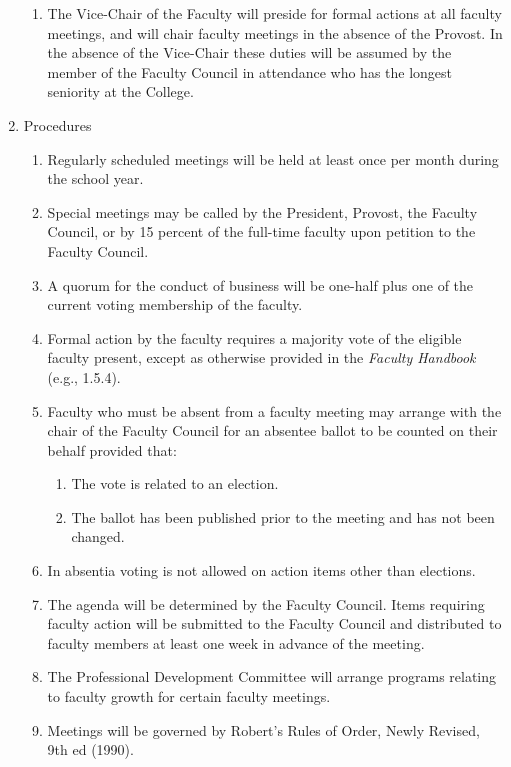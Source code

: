 \documentclass[letterpaper, 11pt]{article}
\begin{document}
\begin{enumerate}[label=\alph*)]
{\begin{enumerate}[label=\arabic*)]
							\item{The Vice-Chair of the Faculty will preside for formal actions at all faculty meetings, and will chair faculty meetings in the absence of the Provost.  In the absence of the Vice-Chair these duties will be assumed by the member of the Faculty Council in attendance who has the longest seniority at the College.}
						\end{enumerate}
					}
					\item{Procedures
						\begin{enumerate}[label=\arabic*)]
							\item{Regularly scheduled meetings will be held at least once per month during the school year.}
							\item{Special meetings may be called by the President, Provost, the Faculty Council, or by 15 percent of the full-time faculty upon petition to the Faculty Council.}
							\item{A quorum for the conduct of business will be one-half plus one of the current voting membership of the faculty.}
							\item{Formal action by the faculty requires a majority vote of the eligible faculty present, except as otherwise provided in the \emph{Faculty Handbook} (e.g., 1.5.4).}
							\item{Faculty who must be absent from a faculty meeting may arrange with the chair of the Faculty Council for an absentee ballot to be counted on their behalf provided that:
								\begin{enumerate}[label=(\arabic*)]
									\item{The vote is related to an election.}
									\item{The ballot has been published prior to the meeting and has not been changed.}
								\end{enumerate}
							}
							\item{In absentia voting is not allowed on action items other than elections.}
							\item{The agenda will be determined by the Faculty Council.  Items requiring faculty action will be submitted to the Faculty Council and distributed to faculty members at least one week in advance of the meeting.}
							\item{The Professional Development Committee will arrange programs relating to faculty growth for certain faculty meetings.}
							\item{Meetings will be governed by Robert's Rules of Order, Newly Revised, 9th ed (1990).}

\end{enumerate}}
\end{enumerate}
\end{document}
